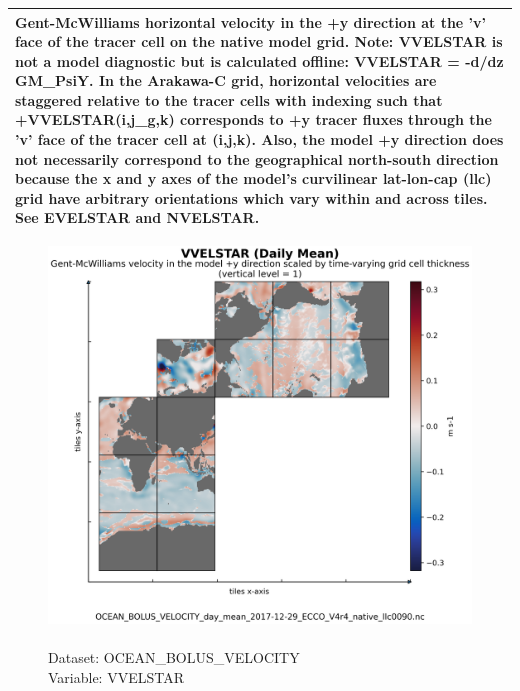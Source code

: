 \begin{longtable}{|p{}|p{}|p{}|p{}|}
\multicolumn{4}{|p{1\textwidth}|}{Gent-McWilliams horizontal velocity in the +y direction at the 'v' face of the tracer cell on the native model grid. Note: VVELSTAR is not a model diagnostic but is calculated offline: VVELSTAR = -d/dz GM\_PsiY. In the Arakawa-C grid, horizontal velocities are staggered relative to the tracer cells with indexing such that +VVELSTAR(i,j\_g,k) corresponds to +y tracer fluxes through the 'v' face of the tracer cell at (i,j,k). Also, the model +y direction does not necessarily correspond to the geographical north-south direction because the x and y axes of the model's curvilinear lat-lon-cap (llc) grid have arbitrary orientations which vary within and across tiles. See EVELSTAR and NVELSTAR.} \\ \hline
\end{longtable}

\begin{figure}[H]
\centering
\includegraphics[scale=0.5]{../images/plots/native_plots/Gent-McWilliams_Ocean_Bolus_Velocity/VVELSTAR.png}
\caption{\\Dataset: OCEAN\_BOLUS\_VELOCITY\\Variable: VVELSTAR}
\label{tab:table-OCEAN_BOLUS_VELOCITY_VVELSTAR-Plot}
\end{figure}
\pagebreak
